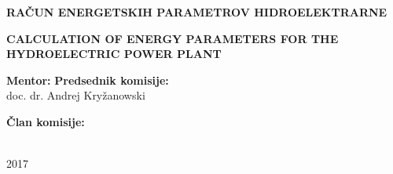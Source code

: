 \begin{minipage}{\textwidth}
\begin{center}
\vspace*{1cm}

\begin{Large}
\textbf{RAČUN ENERGETSKIH PARAMETROV HIDROELEKTRARNE}
\end{Large}


\vspace*{2cm}

\begin{Large}
	\textbf{CALCULATION OF ENERGY PARAMETERS FOR THE HYDROELECTRIC POWER PLANT}
\end{Large}



\end{center}
\vspace*{4cm}




\begin{large}
	\textbf{Mentor:}    \hfill  \textbf{Predsednik komisije:}\\
	doc. dr. Andrej Kryžanowski \\
\end{large}



\begin{large}
	\textbf{Član komisije:}\\
	\\
\end{large}
\vspace{5cm}

\begin{center}
\textsc{2017}
\end{center}

\end{minipage}

\newpage
\thispagestyle{empty}
\cleardoublepage